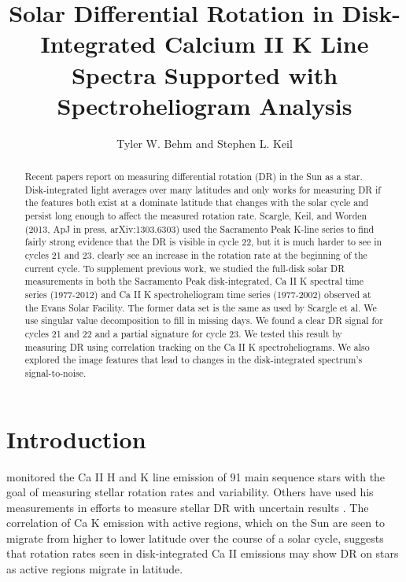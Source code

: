 \documentclass[preprint2]{aastex}
\begin{document}
\title{Solar Differential Rotation in Disk-Integrated Calcium II K Line Spectra Supported with Spectroheliogram Analysis}

\author{Tyler W. Behm and Stephen L. Keil}


\begin{abstract}
Recent papers report on measuring differential rotation (DR) in the Sun as a star. Disk-integrated light averages over many latitudes and only works for measuring DR if the features both exist at a dominate latitude that changes with the solar cycle and persist long enough to affect the measured rotation rate. Scargle, Keil, and Worden (2013, ApJ in press, arXiv:1303.6303) used the Sacramento Peak K-line series to find fairly strong evidence that the DR is visible in cycle 22, but it is much harder to see in cycles 21 and 23. \cite{bert12} clearly see an increase in the rotation rate at the beginning of the current cycle. To supplement previous work, we studied the full-disk solar DR measurements in both the Sacramento Peak disk-integrated, Ca II K spectral time series (1977-2012) and  Ca II K spectroheliogram time series (1977-2002) observed at the Evans Solar Facility. The former data set is the same as used by Scargle et al. We use singular value decomposition to fill in missing days. We found a clear DR signal for cycles 21 and 22 and a partial signature for cycle 23. We tested this result by measuring DR using correlation tracking on the Ca II K spectroheliograms. We also explored the image features that lead to changes in the disk-integrated spectrum's signal-to-noise.
\end{abstract}


\section{Introduction}

\cite{wils78} monitored the Ca II H and K line emission of 91 main sequence stars with the goal of measuring stellar rotation rates and variability. Others have used his measurements in efforts to measure stellar DR with uncertain results \citep{bali85}. The correlation of Ca K emission with active regions, which on the Sun are seen to migrate from higher to lower latitude over the course of a solar cycle, suggests that rotation rates seen in disk-integrated Ca  II emissions may show DR on stars as active regions migrate in latitude.
\end{document}
